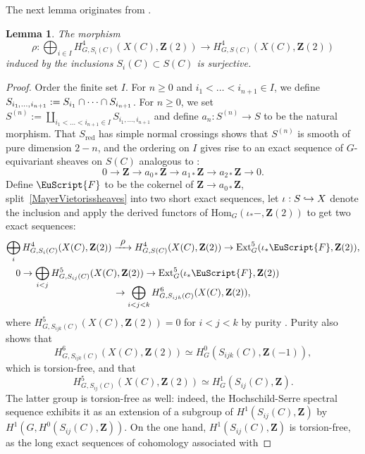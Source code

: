 \documentclass[JEP,XML,SOM,Unicode]{cedram}
\let\mathcal\EuScript
\newcommand\hto{\mathrel{\lhook\joinrel\to}}
\newcommand{\To}[1]{\mathchoice{\xrightarrow{\textstyle\kern4pt#1\kern3pt}}{\stackrel{#1}{\longrightarrow}}{}{}}
\theoremstyle{plain}
\newtheorem{lem}[thm]{Lemma}
\theoremstyle{definition}
\numberwithin{equation}{section}
\newcommand{\Z}{{\mathbf Z}}
\newcommand{\red}{{\mathrm{red}}}
\newcommand{\Hom}{{\mathrm{Hom}}}
\newcommand{\Ext}{{\mathrm{Ext}}}
\begin{document}
The next lemma originates from \cite[\S\S 4.2--4.3]{ewzcl}.

\begin{lem}
\label{lem:cohofibrespeciale}
The morphism\vspace*{-3pt}
\[
\rho:\bigoplus_{i\in I} H^4_{G,S_i(C)}(X(C),\Z(2))\to H^4_{G,S(C)}(X(C),\Z(2))
\]
induced by the inclusions $S_i(C)\subset S(C)$ is surjective.
\end{lem}

\begin{proof}
Order the finite set $I$. For $n\geq 0$ and $i_1<\dots<i_{n+1}\in I$, we define $S_{i_1\mkern-1mu,\mkern1mu\dots,\mkern1mui_{n+1}}:=S_{i_1}\cap\dots \cap S_{i_{n+1}}$.
For $n \geq 0$, we set
$S^{(n)}:=\coprod_{i_1<\dots<i_{n+1}\in I} S_{i_1,\dots,i_{n+1}}$
and define $a_n:S^{(n)}\to S$ to be the natural morphism. That $S_\red$ has simple normal crossings shows that $S^{(n)}$ is smooth of pure dimension $2-n$, and the ordering on $I$ gives rise to an exact sequence of $G$-equivariant sheaves on $S(C)$
analogous to \cite[(3.7)]{ewzcl}:\vspace*{-3pt}
\begin{equation}
\label{MayerVietorissheaves}
0\to \Z\to a_{0*}\Z\to a_{1*}\Z\to a_{2*}\Z\to 0.
\end{equation}
Define $\mathcal{F}$ to be the cokernel of $\Z\to a_{0*}\Z$, split~\eqref{MayerVietorissheaves} into two short exact sequences,
let $\iota:S \hto X$ denote the inclusion
and apply the derived functors of $\Hom_G(\iota_*-,\Z(2))$ to get two exact sequences:\vspace*{-3pt}
\begin{multline}
\label{shortMV}
\bigoplus_i H^4_{G,S_i(C)}(X(C),\Z(2))\To{\rho} H^4_{G,S(C)}(X(C),\Z(2))\to \Ext^5_G(\iota_*\mathcal{F},\Z(2)),\\
\shoveleft{0\to \bigoplus_{i<j} H^5_{G,S_{ij}(C)}(X(C),\Z(2))\to \Ext^5_G(\iota_*\mathcal{F},\Z(2))}\\[-8pt]
\to \bigoplus_{i<j<k} H^6_{G,S_{ijk}(C)}(X(C),\Z(2)),
\end{multline}
where $H^5_{G,S_{ijk}(C)}(X(C),\Z(2))=0$ for $i<j<k$ by purity \cite[(\ref*{BW1-eq:equivariant purity subvariety})]{BW1}.
Purity also shows that\vspace*{-3pt}
\[
H^6_{G,S_{ijk}(C)}(X(C),\Z(2))\simeq H^0_G(S_{ijk}(C),\Z(-1)),
\]
which is torsion-free, and that\vspace*{-3pt}
\[
H^5_{G,S_{ij}(C)}(X(C),\Z(2))\simeq H^1_G(S_{ij}(C),\Z).
\]
The latter group is torsion-free as well: indeed, the Hochschild-Serre spectral sequence \cite[(\ref*{BW1-eq:hochschild-serre})]{BW1} exhibits it as an extension of a subgroup of $H^1(S_{ij}(C),\Z)$ by $H^1(G, H^0(S_{ij}(C),\Z))$. On the one hand, $H^1(S_{ij}(C),\Z)$ is torsion-free, as the long exact sequences of cohomology associated with\vspace*{-3pt}

\end{proof}
\end{document}
